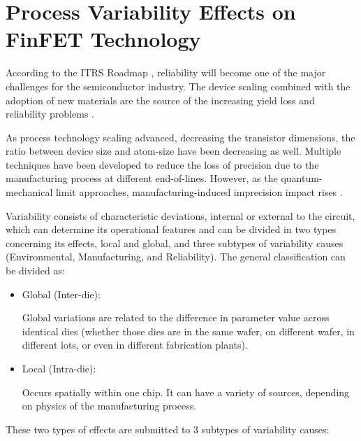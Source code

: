 \documentclass[diss,pgmicro,english]{iiufrgs}
\begin{document}
\chapter{Process Variability Effects on FinFET Technology}

According to the ITRS Roadmap \cite{blish2003critical}, reliability will become one of the major challenges for the semiconductor industry. The device scaling combined with the adoption of new materials are the source of the increasing yield loss and reliability problems \cite{gielen2008emerging}.

As process technology scaling advanced, decreasing the transistor dimensions, the ratio between device size and atom-size have been decreasing as well. Multiple techniques have been developed to reduce the loss of precision due to the manufacturing process at different end-of-lines. However, as the quantum-mechanical limit approaches, manufacturing-induced imprecision impact rises \cite{asenov1999random} \cite{neuberger2014protecting}.

Variability consists of characteristic deviations, internal or external to the circuit, which can determine its operational features and can be divided in two types concerning its effects, local and global, and three subtypes of variability causes (Environmental, Manufacturing, and Reliability). The general classification can be divided as:

\begin{itemize}

\item Global (Inter-die):

	Global variations are related to the difference in parameter value across identical dies (whether those dies are in the same wafer, on different wafer, in different lots, or even in different fabrication plants).

\item Local (Intra-die):

	Occurs spatially within one chip. It can have a variety of sources, depending on physics of the manufacturing process.

\end{itemize}

	These two types of effects are submitted to 3 subtypes of variability causes:
\end{document}
